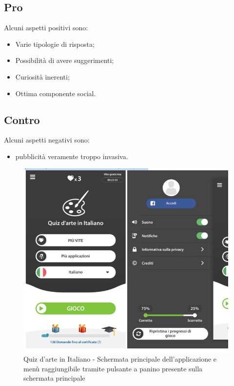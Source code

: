 \documentclass{article}
\begin{document}
\subsection{Pro}
Alcuni aspetti positivi sono:
\begin{itemize}
\item Varie tipologie di risposta;
\item Possibilità di avere suggerimenti;
\item Curiosità inerenti;
\item Ottima componente social.
\end{itemize}

\subsection{Contro}
Alcuni aspetti negativi sono:
\begin{itemize}
\item pubblicità veramente troppo invasiva.
\end{itemize}

\begin{figure}[htp]
\begin{center}
\includegraphics[width=1 \textwidth]{Figure14.png}
\caption{Quiz d’arte in Italiano - Schermata principale dell’applicazione e menù raggiungibile tramite pulsante a panino presente sulla schermata principale}
\end{center}
\end{figure}
\end{document}
